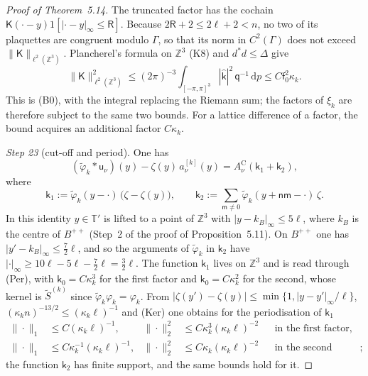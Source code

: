 \documentclass[11pt]{amsart}
\theoremstyle{definition}
\begin{document}
\begin{proof}[Proof of Theorem~5.14]
The truncated factor has the cochain $\mathsf K(\cdot-y)1[|\cdot-y|_\infty\le\mathsf R]$.
Because $2\mathsf R+2\le2\ell+2<n$, no two of its plaquettes are congruent modulo $\Gamma$, so that its norm in $C^2(\Gamma)$ does not exceed $\|\mathsf K\|_{\ell^2(\mathbb Z^3)}$.
Plancherel's formula on $\mathbb Z^3$ (K8) and $d^*d\le\Delta$ give
\begin{equation*}
\|\mathsf K\|^2_{\ell^2(\mathbb Z^3)}\le(2\pi)^{-3}\int_{[-\pi,\pi]^3}|\hat{\mathsf k}|^2\,\mathsf q^{-1}\,\mathrm dp\le C\mathsf f_0^2\kappa_k.
\end{equation*}
This is (B0), with the integral replacing the Riemann sum; the factors of $\xi_k$ are therefore subject to the same two bounds.
For a lattice difference of a factor, the bound acquires an additional factor $C\kappa_k$.

\emph{Step 23} (cut-off and period).
One has
\begin{equation*}
(\tilde\varphi_k*\mathsf u_\nu)(y)-\zeta(y)\,a^{[k]}_\nu(y)=A^{\mathrm C}_\nu(\mathsf k_1+\mathsf k_2),
\end{equation*}
where
\begin{equation*}
\mathsf k_1:=\tilde\varphi_k(y-\cdot)\,\bigl(\zeta-\zeta(y)\bigr),\qquad\mathsf k_2:=\sum_{\mathsf m\ne0}\tilde\varphi_k(y+\mathsf n\mathsf m-\cdot)\,\zeta.
\end{equation*}
In this identity $y\in\mathbb T'$ is lifted to a point of $\mathbb Z^3$ with $|y-k_B|_\infty\le5\ell$, where $k_B$ is the centre of $B^{++}$ (Step~2 of the proof of Proposition~5.11).
On $B^{++}$ one has $|y'-k_B|_\infty\le\frac72\ell$, and so the arguments of $\tilde\varphi_k$ in $\mathsf k_2$ have $|\cdot|_\infty\ge10\ell-5\ell-\frac72\ell=\frac32\ell$.
The function $\mathsf k_1$ lives on $\mathbb Z^3$ and is read through (Per), with $\mathsf k_0=C\kappa_k^3$ for the first factor and $\mathsf k_0=C\kappa_k^2$ for the second, whose kernel is $\tilde S^{(k)}$ since $\tilde\varphi_k\varphi_k=\varphi_k$.
From $|\zeta(y')-\zeta(y)|\le\min\{1,|y-y'|_\infty/\ell\}$, $(\kappa_kn)^{-13/2}\le(\kappa_k\ell)^{-1}$ and (Ker) one obtains for the periodisation of $\mathsf k_1$
\begin{align*}
\|\cdot\|_1&\le C(\kappa_k\ell)^{-1},&\|\cdot\|_2^2&\le C\kappa_k^3(\kappa_k\ell)^{-2}&&\text{in the first factor},\\
\|\cdot\|_1&\le C\kappa_k^{-1}(\kappa_k\ell)^{-1},&\|\cdot\|_2^2&\le C\kappa_k(\kappa_k\ell)^{-2}&&\text{in the second factor};
\end{align*}
the function $\mathsf k_2$ has finite support, and the same bounds hold for it.

\end{proof}
\end{document}
